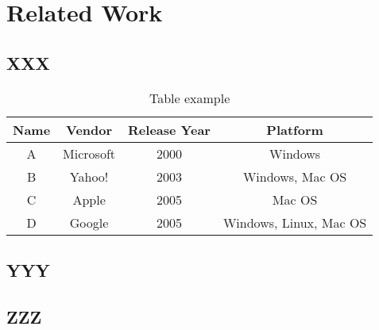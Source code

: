 \chapter{Related Work\label{cha:chapter2}}

\section{XXX \label{sec:ch2xxx}}

\begin{table}[h]
\caption{Table example}
\centering
\begin{tabular}[t]{|c|c|c|c|}
\hline
Name & Vendor & Release Year & Platform \\
\hline\hline
A & Microsoft & 2000 & Windows \\
\hline
B & Yahoo! & 2003 & Windows, Mac OS \\
\hline
C & Apple & 2005 & Mac OS \\
\hline
D & Google & 2005 & Windows, Linux, Mac OS \\
\hline
\end{tabular}
\label{tab:enghistory}
\end{table}

\section{YYY \label{sec:ch2yyy}}

\section{ZZZ \label{sec:ch2zzz}}